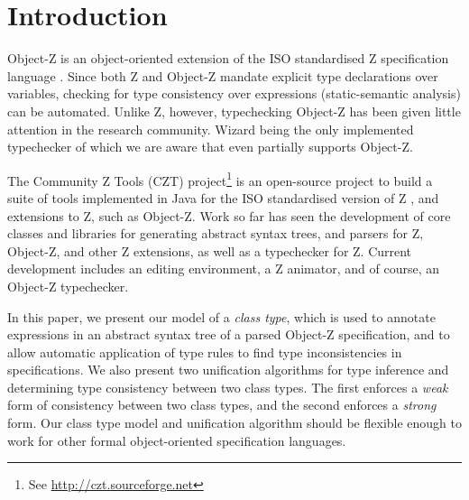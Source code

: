 \section{Introduction}

Object-Z \cite{smith00} is an object-oriented extension of the ISO
standardised Z specification language \cite{spivey92}. Since both Z
and Object-Z mandate explicit type declarations over variables,
checking for type consistency over expressions (static-semantic
analysis) can be automated. Unlike Z, however, typechecking Object-Z
has been given little attention in the research community. Wizard
\cite{johnston96} being the only implemented typechecker of which we
are aware that even partially supports Object-Z.

The Community Z Tools (CZT) project\footnote{See
\url{http://czt.sourceforge.net}} is an open-source project to build a
suite of tools implemented in Java for the ISO standardised version of
Z \cite{isoz}, and extensions to Z, such as Object-Z. Work so far has
seen the development of core classes and libraries for generating
abstract syntax trees, and parsers for Z, Object-Z, and other Z
extensions, as well as a typechecker for Z. Current development
includes an editing environment, a Z animator, and of course, an
Object-Z typechecker.

In this paper, we present our model of a {\em class type}, which is
used to annotate expressions in an abstract syntax tree of a parsed
Object-Z specification, and to allow automatic application of type
rules to find type inconsistencies in specifications. We also present
two unification algorithms for type inference and determining type
consistency between two class types. The first enforces a {\em weak}
form of consistency between two class types, and the second enforces a
{\em strong} form. Our class type model and unification algorithm
should be flexible enough to work for other formal object-oriented
specification languages.

